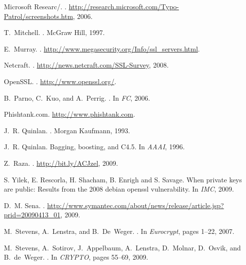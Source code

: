 \documentclass[twocolumn]{article}
\begin{document}
\begin{thebibliography}{10}
{Microsoft Researc/}.
.
\newblock \url{http://research.microsoft.com/Typo-Patrol/screenshots.htm},
  2006.

T.~Mitchell.
.
\newblock McGraw Hill, 1997.

E.~Murray.
.
\newblock
  \url{http://www.megasecurity.org/Info/ssl_servers.html}.

Netcraft.
.
\newblock \url{http://news.netcraft.com/SSL-Survey}, 2008.

{OpenSSL}.
.
\newblock \url{http://www.openssl.org/}.

B.~Parno, C.~Kuo, and A.~Perrig.
.
\newblock In {\em FC}, 2006.

{Phishtank.com}.
\newblock \url{http://www.phishtank.com}.

J.~R. Quinlan.
.
\newblock Morgan Kaufmann, 1993.

J.~R. Quinlan.
\newblock Bagging, boosting, and C4.5.
\newblock In {\em AAAI}, 1996.

Z.~Raza.
.
\newblock
  \url{http://bit.ly/ACJzel}, 2009.

{S. Yilek, E. Rescorla, H. Shacham, B. Enrigh and S. Savage}.
\newblock When private keys are public: Results from the 2008 debian openssl
  vulnerability.
\newblock In {\em IMC}, 2009.

D.~M. Sena.
.
\newblock
  \url{http://www.symantec.com/about/news/release/article.jsp?prid=20090413_01}, 2009.

M.~Stevens, A.~Lenstra, and B.~De~Weger.
.
\newblock In {\em Eurocrypt}, pages 1--22, 2007.

M.~Stevens, A.~Sotirov, J.~Appelbaum, A.~Lenstra, D.~Molnar, D.~Osvik, and
  B.~de~Weger.
.
\newblock In {\em CRYPTO}, pages 55--69, 2009.


\end{thebibliography}
\end{document}
